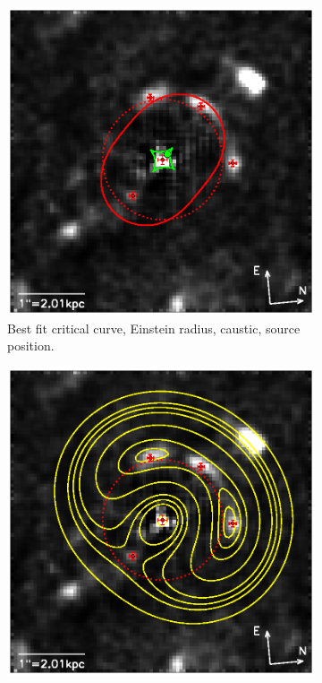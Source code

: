 
\begin{figure}
\centering
\begin{subfigure}{.5\textwidth}
  \centering
  \includegraphics[width=.9\linewidth]{fig/lens_einstein.ps}
  \caption{Best fit critical curve, Einstein radius, caustic, source position.}
  \label{fig:lensbestfiteinsteincurves}
\end{subfigure}%
\begin{subfigure}{.5\textwidth}
  \centering
  \includegraphics[width=.9\linewidth]{fig/lens_timedelay.ps}

\end{subfigure}
\end{figure}
